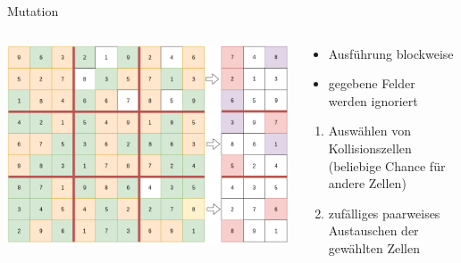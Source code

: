 \begin{frame}{Mutation}
    \begin{columns}[T] %
        \begin{column}{0.75\textwidth}
            \includegraphics[width=\textwidth]{Pictures/Mutation.png}
        \end{column}
        \begin{column}{0.35\textwidth}
            \begin{itemize}
                \item Ausführung blockweise
                \item gegebene Felder werden ignoriert
            \end{itemize}
            \begin{enumerate}
                \item Auswählen von Kollisionszellen (beliebige Chance für andere Zellen) 
                \item zufälliges paarweises Austauschen der gewählten Zellen
            \end{enumerate}
        \end{column}
    \end{columns}
\end{frame}
